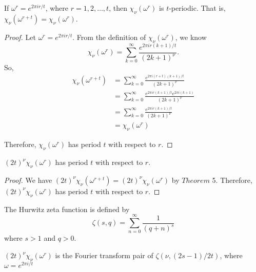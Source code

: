 \documentclass[../article.tex]{subfiles}
\begin{document}
\begin{theorem}
If $\omega^r = e^{2\pi i r/t}$, where $r=1,2,\ldots,t$, then $\chi_{\nu}(\omega^r)$ is $t$-periodic. That is, $\chi_{\nu}(\omega^{r+t}) = \chi_{\nu}(\omega^r)$.
\end{theorem}

\begin{proof}
Let $\omega^r = e^{2\pi i r/t}$. From the definition of $\chi_{\nu}(\omega^r)$, we know
\begin{equation}
\chi_{\nu}(\omega^{r}) = \sum_{k=0}^{\infty} \frac{e^{2 \pi i r(k+1)/t}}{(2k+1)^{\nu}}.
\end{equation}
So,
\begin{equation}
\begin{split}
\chi_{\nu}(\omega^{r+t}) &= \sum_{k=0}^{\infty} \frac{e^{2 \pi i (r+t)(k+1)/t}}{(2k+1)^{\nu}} \\
&= \sum_{k=0}^{\infty} \frac{e^{2 \pi i r(k+1)/t}e^{2 \pi i(k+1)}}{(2k+1)^{\nu}} \\
&= \sum_{k=0}^{\infty} \frac{e^{2 \pi i r(k+1)/t}}{(2k+1)^{\nu}} \\
&= \chi_{\nu}(\omega^r)
\end{split}
\end{equation}

Therefore, $\chi_{\nu}(\omega^r)$ has period $t$ with respect to $r$.
\end{proof}

\begin{corollary}
$(2t)^{\nu} \chi_{\nu}(\omega^r)$ has period $t$ with respect to $r$.
\end{corollary}

\begin{proof}
We have $(2t)^{\nu} \chi_{\nu}(\omega^{r+t}) = (2t)^{\nu} \chi_{\nu}(\omega^r)$ by $Theorem$ 5. Therefore, $(2t)^{\nu} \chi_{\nu}(\omega^r)$ has period $t$ with respect to $r$.
\end{proof}

\begin{definition}
The Hurwitz zeta function is defined by
\begin{equation}
\zeta(s,q) = \sum_{n=0}^{\infty} \frac{1}{(q+n)^s}
\end{equation}
where $s > 1$ and $q > 0$.
\end{definition}

\begin{theorem}
$(2t)^\nu \chi_{\nu}(\omega^{r})$ is the Fourier transform pair of $\zeta(\nu, (2s-1)/2t)$, where $\omega = e^{2\pi i/t}$
\end{theorem}
\end{document}
